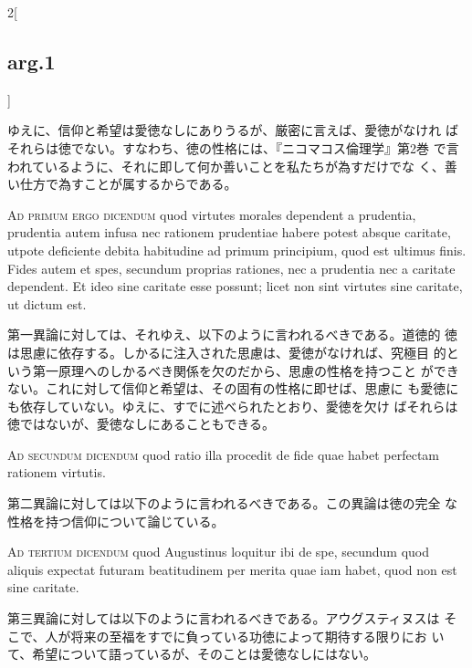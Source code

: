 \documentclass[paper=a4paper,fontsize=10pt,jafontsize=9pt,titlepage]{jlreq}
\begin{document}
\begin{paracol}{2}[\subsection{arg.1}]
\switchcolumn

ゆえに、信仰と希望は愛徳なしにありうるが、厳密に言えば、愛徳がなけれ
 ばそれらは徳でない。すなわち、徳の性格には、『ニコマコス倫理学』第2巻
 で言われているように、それに即して何か善いことを私たちが為すだけでな
 く、善い仕方で為すことが属するからである。

\switchcolumn*[\subsection{ad.1}]

{\scshape Ad primum ergo dicendum} quod virtutes morales dependent a
prudentia, prudentia autem infusa nec rationem prudentiae habere
potest absque caritate, utpote deficiente debita habitudine ad primum
principium, quod est ultimus finis. Fides autem et spes, secundum
proprias rationes, nec a prudentia nec a caritate dependent. Et ideo
sine caritate esse possunt; licet non sint virtutes sine caritate, ut
dictum est.

\switchcolumn

第一異論に対しては、それゆえ、以下のように言われるべきである。道徳的
 徳は思慮に依存する。しかるに注入された思慮は、愛徳がなければ、究極目
 的という第一原理へのしかるべき関係を欠のだから、思慮の性格を持つこと
 ができない。これに対して信仰と希望は、その固有の性格に即せば、思慮に
 も愛徳にも依存していない。ゆえに、すでに述べられたとおり、愛徳を欠け
 ばそれらは徳ではないが、愛徳なしにあることもできる。

\switchcolumn*[\subsection{ad.2}]

{\scshape Ad secundum dicendum} quod ratio illa procedit de fide quae
habet perfectam rationem virtutis.

\switchcolumn

第二異論に対しては以下のように言われるべきである。この異論は徳の完全
 な性格を持つ信仰について論じている。

\switchcolumn*[\subsection{ad.3}]

{\scshape Ad tertium dicendum} quod Augustinus loquitur ibi de spe,
secundum quod aliquis expectat futuram beatitudinem per merita quae
iam habet, quod non est sine caritate.

\switchcolumn

第三異論に対しては以下のように言われるべきである。アウグスティヌスは
 そこで、人が将来の至福をすでに負っている功徳によって期待する限りにお
 いて、希望について語っているが、そのことは愛徳なしにはない。

\end{paracol}
\newpage
{}
{}
\setcounter{section}{5}
\setcounter{subsection}{0}
\end{document}

